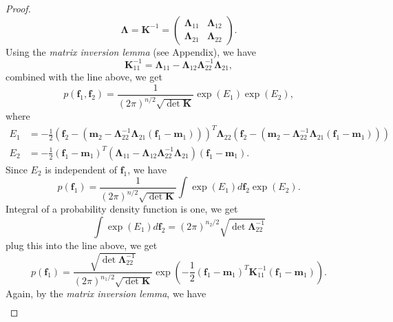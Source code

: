 \documentclass[12pt,a4paper]{article}
\theoremstyle{definition}
\numberwithin{equation}{section}
\let\vec\mathbf
\begin{document}
\begin{proof}
\begin{equation*}
	\vec \Lambda = \vec K^{-1} = 
	\begin{pmatrix}
	\vec\Lambda_{11} & \vec\Lambda_{12}\\
	\vec\Lambda_{21} & \vec\Lambda_{22}
	\end{pmatrix}.
	\end{equation*}
	Using the \textit{matrix inversion lemma} (see Appendix), we have
	\begin{equation*} \label{}
	\vec K_{11}^{-1} = \vec\Lambda_{11}-\vec\Lambda_{12}\vec\Lambda_{22}^{-1}\vec\Lambda_{21},
	\end{equation*}
	combined with the line above, we get
	\begin{equation*} \label{}
	p(\vec f_1,\vec f_2) = \frac{1}{(2\pi)^{n/2}\sqrt{\det \vec K}}\exp{(E_1)}\exp{(E_2)},
	\end{equation*}
	where
	\begin{equation*} \label{}
	\begin{split}
	E_1 &=-\frac{1}{2}\left(\vec f_2-(\vec m_2 - \vec\Lambda_{22}^{-1} \vec\Lambda_{21}(\vec f_1 - \vec m_1))\right)^T\vec\Lambda_{22}\left(\vec f_2-(\vec m_2 - \vec\Lambda_{22}^{-1} \vec\Lambda_{21}(\vec f_1 - \vec m_1))\right)\\
	E_2 & = -\frac{1}{2}\left(\vec f_1 - \vec m_1\right)^T\left(\vec\Lambda_{11}-\vec\Lambda_{12}\vec\Lambda_{22}^{-1}\vec\Lambda_{21}\right)\left(\vec f_1 - \vec m _1 \right).
	\end{split}
	\end{equation*}
	Since $E_2$ is independent of $\vec f_1$, we have
	\begin{equation*} \label{}
	p(\vec f_1) = \frac{1}{(2\pi)^{n/2}\sqrt{\det \vec K}}\int \exp{(E_1)}d\vec f_2\exp{(E_2)}.
	\end{equation*}
	Integral of a probability density function is one, we get
	\begin{equation*} \label{}
	\int \exp{(E_1)}d\vec f_2 = (2\pi)^{n_2/2}\sqrt{\det \vec \Lambda_{22}^{-1}}
	\end{equation*}
	plug this into the line above, we get
	\begin{equation*} \label{}
	p(\vec f_1) = \frac{\sqrt{\det \vec \Lambda_{22}^{-1}}}{(2\pi)^{n_1/2}\sqrt{\det \vec K}} \exp{\left(-\frac{1}{2}\left(\vec f_1 - \vec m_1\right)^T\vec K_{11}^{-1}\left(\vec f_1 - \vec m _1 \right)\right)}.
	\end{equation*}
	Again, by the \textit{matrix inversion lemma}, we have
	\begin{equation*} \label{}
	\begin{split}

\end{split}
\end{equation*}
\end{proof}
\end{document}
